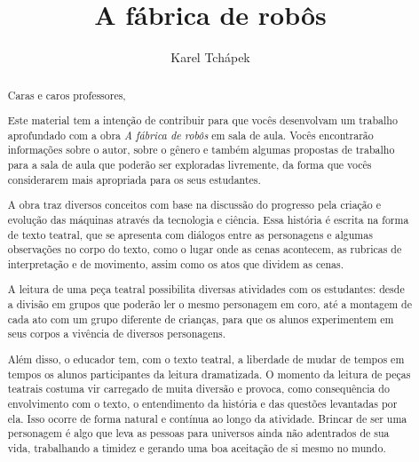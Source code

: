 \documentclass[11pt]{extarticle}
\newcommand{\AutorLivro}{Karel Tchápek}
\newcommand{\TituloLivro}{A fábrica de robôs}
\newcommand{\colaborador}{Gabriela Karam}
\begin{document}
\title{\TituloLivro}
\author{\AutorLivro}
\def\authornotes{\colaborador}

\date{}
\maketitle


\tableofcontents


\begin{abstract}

Caras e caros professores,

Este material tem a intenção de contribuir para que vocês desenvolvam um trabalho aprofundado com a obra \textit{A fábrica de robôs} em sala de aula.
Vocês encontrarão informações sobre o autor, sobre o gênero e também 
algumas propostas de trabalho para a sala de aula que poderão ser exploradas livremente, 
da forma que vocês considerarem mais apropriada para os seus estudantes.

A obra traz diversos conceitos com base na discussão do progresso pela criação e evolução das máquinas através da tecnologia e ciência. Essa história é escrita na forma de texto teatral, que se apresenta com diálogos entre as personagens e algumas observações no corpo do texto, como o lugar onde as cenas acontecem, as rubricas de interpretação e de movimento, assim como os atos que dividem as cenas. 

A leitura de uma peça teatral possibilita diversas atividades com os estudantes: desde a divisão em grupos que poderão ler o mesmo personagem em coro, até a montagem de cada ato com um grupo diferente de crianças, para que os alunos experimentem em seus corpos a vivência de diversos personagens. 

Além disso, o educador tem, com o texto teatral, a liberdade de mudar de tempos em tempos os alunos participantes da leitura dramatizada. O momento da leitura de peças teatrais costuma vir carregado de muita diversão e provoca, como consequência do envolvimento com o texto, o entendimento da história e das questões levantadas por ela. Isso ocorre de forma natural e contínua ao longo da atividade. Brincar de ser uma personagem é algo que leva as pessoas para universos ainda não adentrados de sua vida, trabalhando a timidez e gerando uma boa aceitação de si mesmo no mundo.


\end{abstract}
\end{document}
